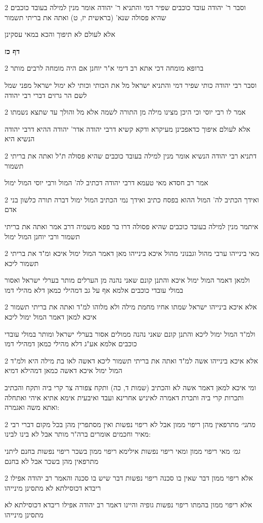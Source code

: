 \documentclass[12pt, openany]{book}
\newcommand{\sethebfont}{
\fontsize{10.5pt}{21.0pt} \selectfont
}
\newcommand{\twocol}[1]{
	{\sethebfont \begin{multicols}{2}
			#1
	\end{multicols}}	
}
\newcommand{\sectname}{}
\newcommand{\newsection}[1]{
	\addcontentsline{toc}{section}{#1}
	\renewcommand{\sectname}{#1}	
	\vspace{-\baselineskip}
	\begin{center}
		\textbf{%
\fontsize{16pt}{16pt}\selectfont
			#1}
	\end{center}
	\vspace{-\baselineskip}
	\nopagebreak
}
\begin{document}
\twocol{וסבר ר' יהודה עובד כוכבים שפיר דמי והתניא ר' יהודה אומר מנין למילה בעובד כוכבים שהיא פסולה שנא' (בראשית יז, ט) ואתה את בריתי תשמור
\par אלא לעולם לא תיפוך והכא במאי עסקינן}
\newsection{דף כז}
\twocol{ברופא מומחה דכי אתא רב דימי א"ר יוחנן אם היה מומחה לרבים מותר
\par וסבר רבי יהודה כותי שפיר דמי והתניא ישראל מל את הכותי וכותי לא ימול ישראל מפני שמל לשם הר גרזים דברי רבי יהודה}
\twocol{אמר לו רבי יוסי וכי היכן מצינו מילה מן התורה לשמה אלא מל והולך עד שתצא נשמתו
\par אלא לעולם איפוך כדאפכינן מעיקרא ודקא קשיא דרבי יהודה אדר' יהודה ההיא דרבי יהודה הנשיא היא}
\twocol{דתניא רבי יהודה הנשיא אומר מנין למילה בעובד כוכבים שהיא פסולה ת"ל ואתה את בריתי תשמור
\par אמר רב חסדא מאי טעמא דרבי יהודה דכתיב לה' המול ורבי יוסי המול ימול}
\twocol{ואידך הכתיב לה' המול ההוא בפסח כתיב ואידך נמי הכתיב המול ימול דברה תורה כלשון בני אדם
\par איתמר מנין למילה בעובד כוכבים שהיא פסולה דרו בר פפא משמיה דרב אמר ואתה את בריתי תשמור ורבי יוחנן המול ימול}
\twocol{מאי בינייהו ערבי מהול וגבנוני מהול איכא בינייהו מאן דאמר המול ימול איכא ומ"ד את בריתי תשמור ליכא
\par ולמאן דאמר המול ימול איכא והתנן קונם שאני נהנה מן הערלים מותר בערלי ישראל ואסור במולי עובדי כוכבים אלמא אף על גב דמהילי כמאן דלא מהילי דמו}
\twocol{אלא איכא בינייהו ישראל שמתו אחיו מחמת מילה ולא מלוהו למ"ד ואתה את בריתי תשמור איכא למאן דאמר המול ימול ליכא
\par ולמ"ד המול ימול ליכא והתנן קונם שאני נהנה ממולים אסור בערלי ישראל ומותר במולי עובדי כוכבים אלמא אע"ג דלא מהילי כמאן דמהילי דמו}
\twocol{אלא איכא בינייהו אשה למ"ד ואתה את בריתי תשמור ליכא דאשה לאו בת מילה היא ולמ"ד המול ימול איכא דאשה כמאן דמהילא דמיא
\par ומי איכא למאן דאמר אשה לא והכתיב (שמות ד, כה) ותקח צפורה צר קרי ביה ותקח והכתיב ותכרות קרי ביה ותכרת דאמרה לאיניש אחרינא ועבד ואיבעית אימא אתיא איהי ואתחלה ואתא משה ואגמרה:}
\twocol{{\large\emph{מתני׳}} מתרפאין מהן ריפוי ממון אבל לא ריפוי נפשות ואין מסתפרין מהן בכל מקום דברי רבי מאיר וחכמים אומרים ברה"ר מותר אבל לא בינו לבינו:
\par {\large\emph{גמ׳}} מאי ריפוי ממון ומאי ריפוי נפשות אילימא ריפוי ממון בשכר ריפוי נפשות בחנם ליתני מתרפאין מהן בשכר אבל לא בחנם}
\twocol{אלא ריפוי ממון דבר שאין בו סכנה ריפוי נפשות דבר שיש בו סכנה והאמר רב יהודה אפילו ריבדא דכוסילתא לא מתסינן מינייהו
\par אלא ריפוי ממון בהמתו ריפוי נפשות גופיה והיינו דאמר רב יהודה אפילו ריבדא דכוסילתא לא מתסינן מינייהו}
\end{document}
